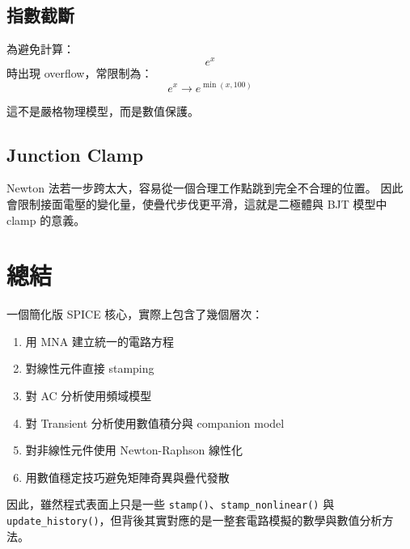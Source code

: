 \documentclass[12pt,a4paper]{article}
\begin{document}
\subsection{指數截斷}

為避免計算：
\[
e^x
\]
時出現 overflow，常限制為：
\[
e^x \rightarrow e^{\min(x, 100)}
\]

這不是嚴格物理模型，而是數值保護。

\subsection{Junction Clamp}

Newton 法若一步跨太大，容易從一個合理工作點跳到完全不合理的位置。  
因此會限制接面電壓的變化量，使疊代步伐更平滑，這就是二極體與 BJT 模型中 clamp 的意義。

\section{總結}

一個簡化版 SPICE 核心，實際上包含了幾個層次：

\begin{enumerate}
\item 用 MNA 建立統一的電路方程
\item 對線性元件直接 stamping
\item 對 AC 分析使用頻域模型
\item 對 Transient 分析使用數值積分與 companion model
\item 對非線性元件使用 Newton-Raphson 線性化
\item 用數值穩定技巧避免矩陣奇異與疊代發散
\end{enumerate}

因此，雖然程式表面上只是一些 \verb|stamp()|、\verb|stamp_nonlinear()| 與 \verb|update_history()|，但背後其實對應的是一整套電路模擬的數學與數值分析方法。
\end{document}
